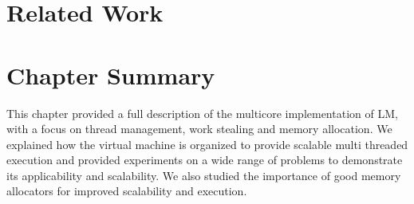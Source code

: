 \section{Related Work}



\section{Chapter Summary}

This chapter provided a full description of the multicore implementation of LM,
with a focus on thread management, work stealing and memory allocation.  We
explained how the virtual machine is organized to provide scalable multi
threaded execution and provided experiments on a wide range of problems to
demonstrate its applicability and scalability. We also studied the importance of
good memory allocators for improved scalability and execution.
